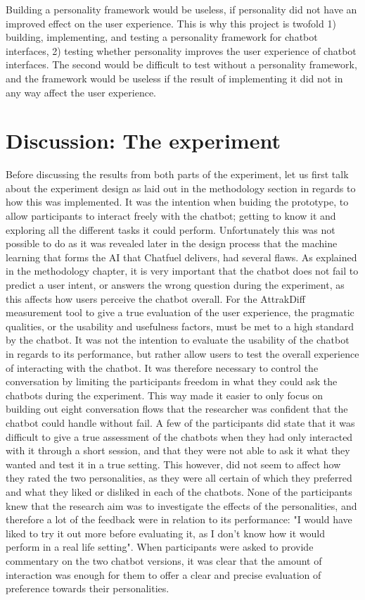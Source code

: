 Building a personality framework would be useless, if personality did not have an improved effect on the user experience. This is why this project is twofold 1) building, implementing, and testing a personality framework for chatbot interfaces, 2) testing whether personality improves the user experience of chatbot interfaces. The second would be difficult to test without a personality framework, and the framework would be useless if the result of implementing it did not in any way affect the user experience.

\section{Discussion: The experiment}
Before discussing the results from both parts of the experiment, let us first talk about the experiment design as laid out in the methodology section in regards to how this was implemented. It was the intention when buiding the prototype, to allow participants to interact freely with the chatbot; getting to know it and exploring all the different tasks it could perform. Unfortunately this was not possible to do as it was revealed later in the design process that the machine learning that forms the AI that Chatfuel delivers, had several flaws. As explained in the methodology chapter, it is very important that the chatbot does not fail to predict a user intent, or answers the wrong question during the experiment, as this affects how users perceive the chatbot overall. For the AttrakDiff measurement tool to give a true evaluation of the user experience, the pragmatic qualities, or the usability and usefulness factors, must be met to a high standard by the chatbot. It was not the intention to evaluate the usability of the chatbot in regards to its performance, but rather allow users to test the overall experience of interacting with the chatbot. It was therefore necessary to control the conversation by limiting the participants freedom in what they could ask the chatbots during the experiment. This way made it easier to only focus on building out eight conversation flows that the researcher was confident that the chatbot could handle without fail. A few of the participants did state that it was difficult to give a true assessment of the chatbots when they had only interacted with it through a short session, and that they were not able to ask it what they wanted and test it in a true setting. This however, did not seem to affect how they rated the two personalities, as they were all certain of which they preferred and what they liked or disliked in each of the chatbots. None of the participants knew that the research aim was to investigate the effects of the personalities, and therefore a lot of the feedback were in relation to its performance: "I would have liked to try it out more before evaluating it, as I don't know how it would perform in a real life setting". When participants were asked to provide commentary on the two chatbot versions, it was clear that the amount of interaction was enough for them to offer a clear and precise evaluation of preference towards their personalities. 

